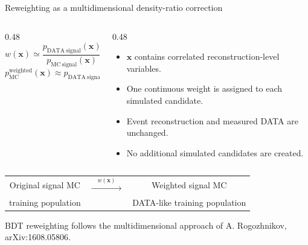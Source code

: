 \begin{frame}[label=p6]{Reweighting as a multidimensional density-ratio correction}
  \small
  \begin{columns}[T,onlytextwidth]
    \begin{column}{0.48\textwidth}
      \[
        w(\mathbf{x}) \simeq
        \frac{p_{\mathrm{DATA\ signal}}(\mathbf{x})}
             {p_{\mathrm{MC\ signal}}(\mathbf{x})}
      \]
      \[
        p_{\mathrm{MC}}^{\mathrm{weighted}}(\mathbf{x})
        \approx p_{\mathrm{DATA\ signal}}(\mathbf{x}) .
      \]
    \end{column}

    \begin{column}{0.48\textwidth}
      \begin{itemize}
        \setlength{\itemsep}{0.45em}
        \item $\mathbf{x}$ contains correlated reconstruction-level variables.
        \item One continuous weight is assigned to each simulated candidate.
        \item Event reconstruction and measured DATA are unchanged.
        \item No additional simulated candidates are created.
      \end{itemize}
    \end{column}
  \end{columns}

  \vspace{0.7em}
  \centering
  \begin{tabular}{ccc}
    Original signal MC & $\xrightarrow{\quad w(\mathbf{x})\quad}$ & Weighted signal MC \\
    training population & & DATA-like training population
  \end{tabular}

  \vfill
  \footnotesize
  BDT reweighting follows the multidimensional approach of A. Rogozhnikov,
  arXiv:1608.05806.
\end{frame}

